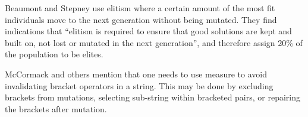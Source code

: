 Beaumont and Stepney use elitism where a certain amount of the most fit individuals move to the next generation without being mutated.
They find indications that ``elitism is required to ensure that good solutions are kept and built on, not lost or mutated in the next generation'', and therefore assign 20\% of the population to be elites.~\cite{2009Beaumont}

McCormack and others mention that one needs to use measure to avoid invalidating bracket operators in a string.
This may be done by excluding brackets from mutations, selecting sub-string within bracketed pairs, or repairing the brackets after mutation.~\cite{2004McCormack}


